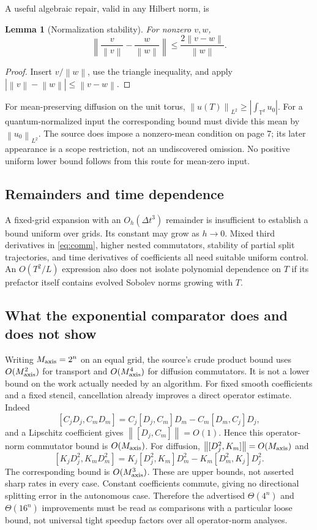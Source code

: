 \documentclass[11pt]{article}
\newtheorem{lemma}{Lemma}
\newcommand{\norm}[1]{\left\lVert #1\right\rVert}
\newcommand{\T}{\mathbb T}
\begin{document}
A useful algebraic repair, valid in any Hilbert norm, is
\begin{lemma}[Normalization stability]
For nonzero $v,w$,
\[
 \left\|\frac v{\norm v}-\frac w{\norm w}\right\|
 \leq\frac{2\norm{v-w}}{\norm w}.
\]
\end{lemma}
\begin{proof}
Insert $v/\norm w$, use the triangle inequality, and apply
$|\norm v-\norm w|\leq\norm{v-w}$.
\end{proof}
For mean-preserving diffusion on the unit torus,
$\norm{u(T)}_{L^2}\geq|\int_{\T^d}u_0|$.
For a quantum-normalized input the corresponding bound must divide
this mean by $\norm{u_0}_{L^2}$.
The source does impose a nonzero-mean condition on page 7; its later
appearance is a scope restriction, not an undiscovered omission.
No positive uniform lower bound follows from this route for mean-zero
input.

\subsection{Remainders and time dependence}
A fixed-grid expansion with an $O_h(\Delta t^3)$ remainder is insufficient
to establish a bound uniform over grids. Its constant may grow as
$h\to0$. Mixed third derivatives in \eqref{eq:comm}, higher nested
commutators, stability of partial split trajectories, and time derivatives
of coefficients all need suitable uniform control.
An $O(T^2/L)$ expression also does not isolate polynomial dependence
on $T$ if its prefactor itself contains evolved Sobolev norms growing
with $T$.

\subsection{What the exponential comparator does and does not show}
Writing $M_{\rm axis}=2^n$ on an equal grid, the source's crude product
bound uses $O(M_{\rm axis}^2)$ for transport and
$O(M_{\rm axis}^4)$ for diffusion commutators.
It is not a lower bound on the work actually needed by an algorithm.
For fixed smooth coefficients and a fixed stencil, cancellation already
improves a direct operator estimate. Indeed
\[
 [C_jD_j,C_mD_m]
 =C_j[D_j,C_m]D_m-C_m[D_m,C_j]D_j,
\]
and a Lipschitz coefficient gives $\norm{[D_j,C_m]}=O(1)$.
Hence this operator-norm commutator bound is $O(M_{\rm axis})$.
For diffusion,
$\norm{[D_j^2,K_m]}=O(M_{\rm axis})$ and
\[
[K_jD_j^2,K_mD_m^2]
=K_j[D_j^2,K_m]D_m^2-K_m[D_m^2,K_j]D_j^2.
\]
The corresponding bound is
$O(M_{\rm axis}^3)$.
These are upper bounds, not asserted sharp rates in every case.
Constant coefficients commute, giving no directional splitting error
in the autonomous case.
Therefore the advertised $\Theta(4^n)$ and $\Theta(16^n)$ improvements
must be read as comparisons with a particular loose bound, not
universal tight speedup factors over all operator-norm analyses.
\end{document}
